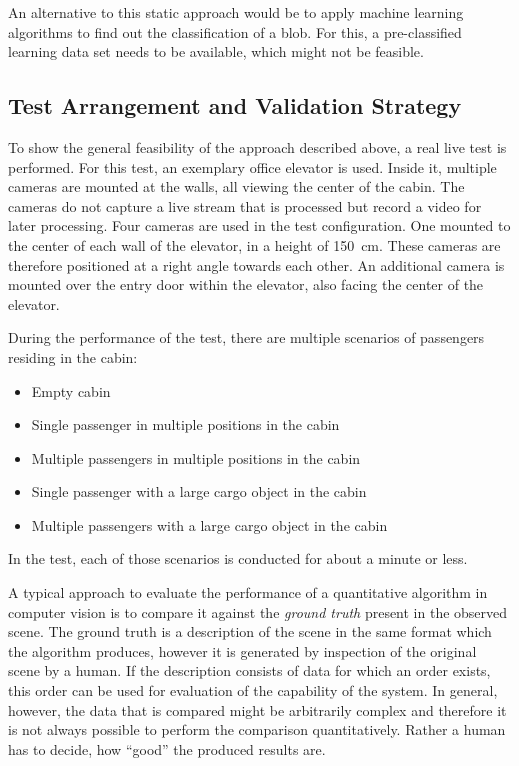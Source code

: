 An alternative to this static approach would be to apply machine learning algorithms to find out the classification of a blob.
For this, a pre-classified learning data set needs to be available, which might not be feasible.

\subsection{Test Arrangement and Validation Strategy}
To show the general feasibility of the approach described above, 
a real live test is performed.
For this test, an exemplary office elevator is used.
Inside it, multiple cameras are mounted at the walls, 
all viewing the center of the cabin.
The cameras do not capture a live stream that is processed but record a video for later processing.
Four cameras are used in the test configuration.
One mounted to the center of each wall of the elevator, in a height of 150~cm.
These cameras are therefore positioned at a right angle towards each other.
An additional camera is mounted over the entry door within the elevator, also facing the center of the elevator.

During the performance of the test, there are multiple scenarios
of passengers residing in the cabin:
\begin{itemize}
    \item Empty cabin
    \item Single passenger in multiple positions in the cabin
    \item Multiple passengers in multiple positions in the cabin
    \item Single passenger with a large cargo object in the cabin
    \item Multiple passengers with a large cargo object in the cabin
\end{itemize}
In the test, each of those scenarios is conducted for about a minute or less.

A typical approach to evaluate the performance of a 
quantitative algorithm in computer vision is to compare it against the \emph{ground truth} present in the observed scene.
The ground truth is a description of the scene in the same format which the algorithm produces, however it is generated by inspection of the original scene by a human.
If the description consists of data for which an order exists, this order can be used for evaluation of the capability of the system.
In general, however, the data that is compared might be arbitrarily complex and therefore it is not always possible to perform the comparison quantitatively. Rather a human has to decide, how \enquote{good} the produced results are.


